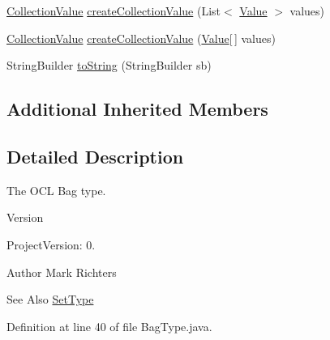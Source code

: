 \begin{DoxyCompactItemize}
\item 
\hyperlink{classorg_1_1tzi_1_1use_1_1uml_1_1ocl_1_1value_1_1_collection_value}{Collection\-Value} \hyperlink{classorg_1_1tzi_1_1use_1_1uml_1_1ocl_1_1type_1_1_bag_type_a571a37998dbf6a334b389dfeec41f012}{create\-Collection\-Value} (List$<$ \hyperlink{classorg_1_1tzi_1_1use_1_1uml_1_1ocl_1_1value_1_1_value}{Value} $>$ values)
\item 
\hyperlink{classorg_1_1tzi_1_1use_1_1uml_1_1ocl_1_1value_1_1_collection_value}{Collection\-Value} \hyperlink{classorg_1_1tzi_1_1use_1_1uml_1_1ocl_1_1type_1_1_bag_type_a192b36f2f52ff55814d2ee1173886fa0}{create\-Collection\-Value} (\hyperlink{classorg_1_1tzi_1_1use_1_1uml_1_1ocl_1_1value_1_1_value}{Value}\mbox{[}$\,$\mbox{]} values)
\item 
String\-Builder \hyperlink{classorg_1_1tzi_1_1use_1_1uml_1_1ocl_1_1type_1_1_bag_type_afc9c1e73d1ccce7c18d6506123c2a0c8}{to\-String} (String\-Builder sb)
\end{DoxyCompactItemize}
\subsection*{Additional Inherited Members}


\subsection{Detailed Description}
The O\-C\-L Bag type.

\begin{DoxyVersion}{Version}

\end{DoxyVersion}
\begin{DoxyParagraph}{Project\-Version\-:}
0. 
\end{DoxyParagraph}
\begin{DoxyAuthor}{Author}
Mark Richters 
\end{DoxyAuthor}
\begin{DoxySeeAlso}{See Also}
\hyperlink{classorg_1_1tzi_1_1use_1_1uml_1_1ocl_1_1type_1_1_set_type}{Set\-Type} 
\end{DoxySeeAlso}


Definition at line 40 of file Bag\-Type.\-java.



